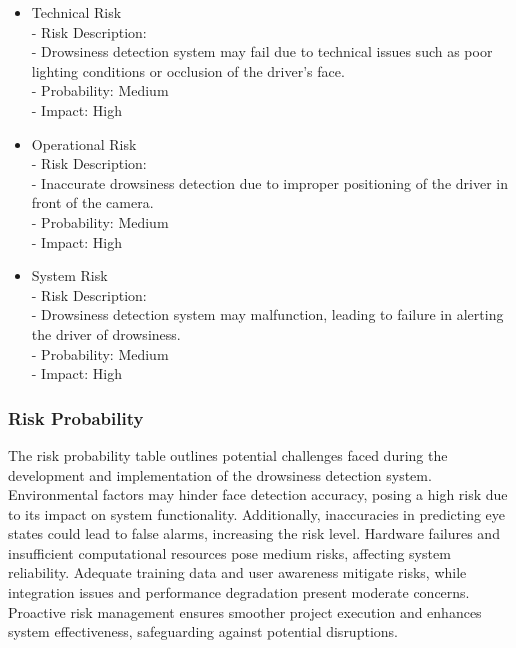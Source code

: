 \documentclass[12pt]{article}
\begin{document}
\begin{itemize}
\item Technical Risk\\
   - Risk Description:\\
     - Drowsiness detection system may fail due to technical issues such as poor lighting conditions or occlusion of the driver's face.\\
   - Probability: Medium\\
   - Impact: High\\
   
\item Operational Risk\\
   - Risk Description:\\ 
     - Inaccurate drowsiness detection due to improper positioning of the driver in front of the camera.\\
   - Probability: Medium\\
   - Impact: High\\
   
\item System Risk\\
   - Risk Description:\\ 
     - Drowsiness detection system may malfunction, leading to failure in alerting the driver of drowsiness.\\
   - Probability: Medium\\
   - Impact: High\\
\end{itemize}
\subsubsection{Risk Probability }
The risk probability table outlines potential challenges faced during the development and implementation of the drowsiness detection system. Environmental factors may hinder face detection accuracy, posing a high risk due to its impact on system functionality. Additionally, inaccuracies in predicting eye states could lead to false alarms, increasing the risk level. Hardware failures and insufficient computational resources pose medium risks, affecting system reliability. Adequate training data and user awareness mitigate risks, while integration issues and performance degradation present moderate concerns. Proactive risk management ensures smoother project execution and enhances system effectiveness, safeguarding against potential disruptions.
\end{document}
